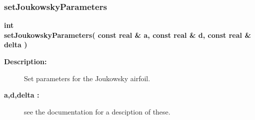 \subsubsection{setJoukowskyParameters}
 
\begin{flushleft} \textbf{%
int  \\ 
\settowidth{\AirfoilMappingIncludeArgIndent}{setJoukowskyParameters(}%
setJoukowskyParameters( const real \& a, const real \& d, const real \& delta )
}\end{flushleft}
\begin{description}
\item[{\bf Description:}] 
    Set parameters for the Joukowsky airfoil.
\item[{\bf a,d,delta :}]  see the documentation for a desciption of these.
\end{description}
